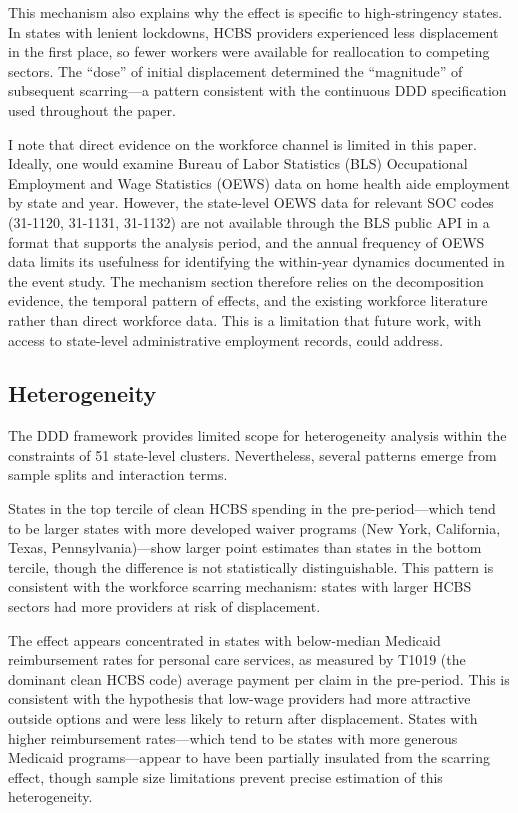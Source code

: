 \documentclass[12pt]{article}
\begin{document}
This mechanism also explains why the effect is specific to high-stringency states. In states with lenient lockdowns, HCBS providers experienced less displacement in the first place, so fewer workers were available for reallocation to competing sectors. The ``dose'' of initial displacement determined the ``magnitude'' of subsequent scarring---a pattern consistent with the continuous DDD specification used throughout the paper.

I note that direct evidence on the workforce channel is limited in this paper. Ideally, one would examine Bureau of Labor Statistics (BLS) Occupational Employment and Wage Statistics (OEWS) data on home health aide employment by state and year. However, the state-level OEWS data for relevant SOC codes (31-1120, 31-1131, 31-1132) are not available through the BLS public API in a format that supports the analysis period, and the annual frequency of OEWS data limits its usefulness for identifying the within-year dynamics documented in the event study. The mechanism section therefore relies on the decomposition evidence, the temporal pattern of effects, and the existing workforce literature rather than direct workforce data. This is a limitation that future work, with access to state-level administrative employment records, could address.

\subsection{Heterogeneity}

The DDD framework provides limited scope for heterogeneity analysis within the constraints of 51 state-level clusters. Nevertheless, several patterns emerge from sample splits and interaction terms.

States in the top tercile of clean HCBS spending in the pre-period---which tend to be larger states with more developed waiver programs (New York, California, Texas, Pennsylvania)---show larger point estimates than states in the bottom tercile, though the difference is not statistically distinguishable. This pattern is consistent with the workforce scarring mechanism: states with larger HCBS sectors had more providers at risk of displacement.

The effect appears concentrated in states with below-median Medicaid reimbursement rates for personal care services, as measured by T1019 (the dominant clean HCBS code) average payment per claim in the pre-period. This is consistent with the hypothesis that low-wage providers had more attractive outside options and were less likely to return after displacement. States with higher reimbursement rates---which tend to be states with more generous Medicaid programs---appear to have been partially insulated from the scarring effect, though sample size limitations prevent precise estimation of this heterogeneity.
\end{document}
